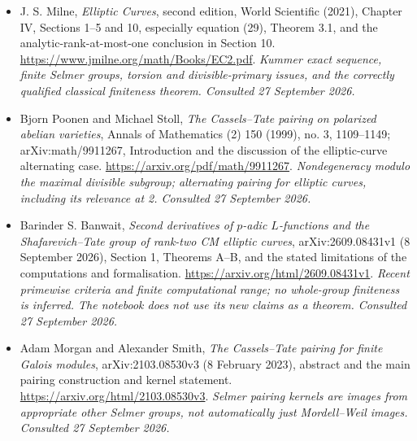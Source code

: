 \documentclass[11pt,a4paper]{article}
\numberwithin{equation}{section}
\begin{document}
\begin{itemize}
\item[\textnormal{[E1]}]\hypertarget{extra:59:1}{} J. S. Milne, \emph{Elliptic Curves}, second edition, World Scientific (2021), Chapter IV, Sections 1--5 and 10, especially equation (29), Theorem 3.1, and the analytic-rank-at-most-one conclusion in Section 10.
\url{https://www.jmilne.org/math/Books/EC2.pdf}.
{\small\textit{Kummer exact sequence, finite Selmer groups, torsion and divisible-primary issues, and the correctly qualified classical finiteness theorem. Consulted 27 September 2026.}}
\item[\textnormal{[E2]}]\hypertarget{extra:59:2}{} Bjorn Poonen and Michael Stoll, \emph{The Cassels--Tate pairing on polarized abelian varieties}, Annals of Mathematics (2) 150 (1999), no. 3, 1109--1149; arXiv:math/9911267, Introduction and the discussion of the elliptic-curve alternating case.
\url{https://arxiv.org/pdf/math/9911267}.
{\small\textit{Nondegeneracy modulo the maximal divisible subgroup; alternating pairing for elliptic curves, including its relevance at 2. Consulted 27 September 2026.}}
\item[\textnormal{[E3]}]\hypertarget{extra:59:3}{} Barinder S. Banwait, \emph{Second derivatives of $p$-adic $L$-functions and the Shafarevich--Tate group of rank-two CM elliptic curves}, arXiv:2609.08431v1 (8 September 2026), Section 1, Theorems A--B, and the stated limitations of the computations and formalisation.
\url{https://arxiv.org/html/2609.08431v1}.
{\small\textit{Recent primewise criteria and finite computational range; no whole-group finiteness is inferred. The notebook does not use its new claims as a theorem. Consulted 27 September 2026.}}
\item[\textnormal{[E4]}]\hypertarget{extra:59:4}{} Adam Morgan and Alexander Smith, \emph{The Cassels--Tate pairing for finite Galois modules}, arXiv:2103.08530v3 (8 February 2023), abstract and the main pairing construction and kernel statement.
\url{https://arxiv.org/html/2103.08530v3}.
{\small\textit{Selmer pairing kernels are images from appropriate other Selmer groups, not automatically just Mordell--Weil images. Consulted 27 September 2026.}}
\end{itemize}
\end{document}
